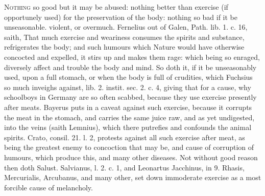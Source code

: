 {{\lettrine{N}{othing} so good but it may be abused: nothing better than exercise (if
opportunely used) for the preservation of the body: nothing so bad if
it be unseasonable. violent, or overmuch. Fernelius out of Galen, Path.
lib. 1. c. 16, saith, That much exercise and weariness consumes
the spirits and substance, refrigerates the body; and such humours
which Nature would have otherwise concocted and expelled, it stirs up
and makes them rage: which being so enraged, diversely affect and
trouble the body and mind. So doth it, if it be unseasonably used, upon
a full stomach, or when the body is full of crudities, which Fuchsius
so much inveighs against, lib. 2. instit. sec. 2. c. 4, giving that for
a cause, why schoolboys in Germany are so often scabbed, because they
use exercise presently after meats. Bayerus puts in a caveat
against such exercise, because it corrupts the meat in the
stomach, and carries the same juice raw, and as yet undigested, into
the veins (saith Lemnius), which there putrefies and confounds the
animal spirits. Crato, consil. 21. l. 2, protests against all
such exercise after meat, as being the greatest enemy to concoction
that may be, and cause of corruption of humours, which produce this,
and many other diseases. Not without good reason then doth Salust.
Salvianus, l. 2. c. 1, and Leonartus Jacchinus, in 9. Rhasis,
Mercurialis, Arcubanus, and many other, set down immoderate
exercise as a most forcible cause of melancholy.

}}

